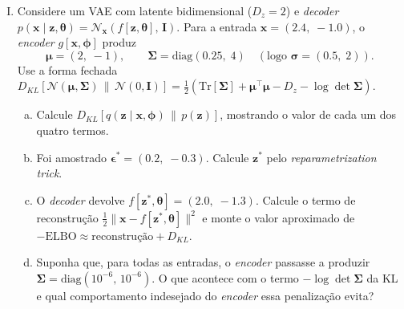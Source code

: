 \documentclass{dlproblemset}
\newcommand{\thetav}{\boldsymbol{\theta}}
\begin{document}
\begin{enumerate}[I)]
    \item Considere um VAE com latente bidimensional ($D_z = 2$) e \textit{decoder} $p(\mathbf{x} \mid \mathbf{z}, \thetav) = \mathcal{N}_{\mathbf{x}}\!\left(f[\mathbf{z},\thetav],\, \mathbf{I}\right)$. Para a entrada $\mathbf{x} = (2.4,\; -1.0)$, o \textit{encoder} $g[\mathbf{x},\boldsymbol{\phi}]$ produz
    \[
      \boldsymbol{\mu} = (2,\; -1), \qquad \boldsymbol{\Sigma} = \mathrm{diag}(0.25,\; 4) \quad (\text{logo } \boldsymbol{\sigma} = (0.5,\; 2)).
    \]
    Use a forma fechada $D_{KL}\!\left[\mathcal{N}(\boldsymbol{\mu},\boldsymbol{\Sigma})\,\|\,\mathcal{N}(0,\mathbf{I})\right] = \tfrac{1}{2}\!\left(\mathrm{Tr}[\boldsymbol{\Sigma}] + \boldsymbol{\mu}^{\top}\boldsymbol{\mu} - D_z - \log\det\boldsymbol{\Sigma}\right)$.
    \begin{enumerate}[(a)]
        \item Calcule $D_{KL}\!\left[q(\mathbf{z} \mid \mathbf{x}, \boldsymbol{\phi})\,\|\,p(\mathbf{z})\right]$, mostrando o valor de cada um dos quatro termos.
        \item Foi amostrado $\boldsymbol{\epsilon}^{*} = (0.2,\; -0.3)$. Calcule $\mathbf{z}^{*}$ pelo \textit{reparametrization trick}.
        \item O \textit{decoder} devolve $f[\mathbf{z}^{*},\thetav] = (2.0,\; -1.3)$. Calcule o termo de reconstrução $\tfrac{1}{2}\lVert \mathbf{x} - f[\mathbf{z}^{*},\thetav]\rVert^{2}$ e monte o valor aproximado de $-\mathrm{ELBO} \approx \text{reconstrução} + D_{KL}$.
        \item Suponha que, para todas as entradas, o \textit{encoder} passasse a produzir $\boldsymbol{\Sigma} = \mathrm{diag}(10^{-6},\, 10^{-6})$. O que acontece com o termo $-\log\det\boldsymbol{\Sigma}$ da KL e qual comportamento indesejado do \textit{encoder} essa penalização evita?
    \end{enumerate}

\end{enumerate}
\end{document}
